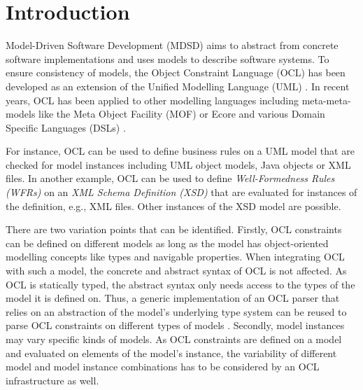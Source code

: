 \section{Introduction}
	
	Model-Driven Software Development (MDSD) aims to abstract from concrete 
	software implementations and uses models to describe 
	software systems. To ensure consistency of models, the Object Constraint Language 
	(OCL) \cite{spec:OCL2-2} has been developed as an extension of the Unified 
	Modelling Language (UML) \cite{spec:UML2-2}. In recent years, OCL has been 
	applied to other modelling languages including meta-meta-models 
	like the Meta Object Facility (MOF) or Ecore and various 
	Domain Specific Languages (DSLs) \cite{oclExample:DSL} . 

	For instance, OCL can be used to define business rules on a UML model 
	that are checked for model instances including UML object models,  
	Java objects or XML files. In another example, OCL can be used to define \textit{Well-Formedness 
	Rules (WFRs)} on an \textit{XML Schema Definition (XSD)} that are evaluated for instances 
	of the definition, e.g., XML files. Other instances of the XSD model are possible.
	
	There are two variation points that can be identified. Firstly, OCL constraints can 
	be defined on different models as long as the model has object-oriented 
	modelling concepts like types and navigable properties. When integrating OCL with 
	such a model, the concrete and abstract syntax of OCL is not affected. 
	As OCL is statically typed, the abstract syntax only needs access to the types of the 
	model it is defined on. Thus, a generic implementation of an OCL parser
	that relies on an abstraction of the model's underlying type system can be
	reused to parse OCL constraints on different types of models \cite{braeuerOCL07}.
	Secondly, model instances may vary specific kinds of models. As OCL constraints 
	are defined on a model and evaluated on elements of the model's instance, the variability 
	of different model and model instance combinations has to be considered by an 
	OCL infrastructure as well.
	
